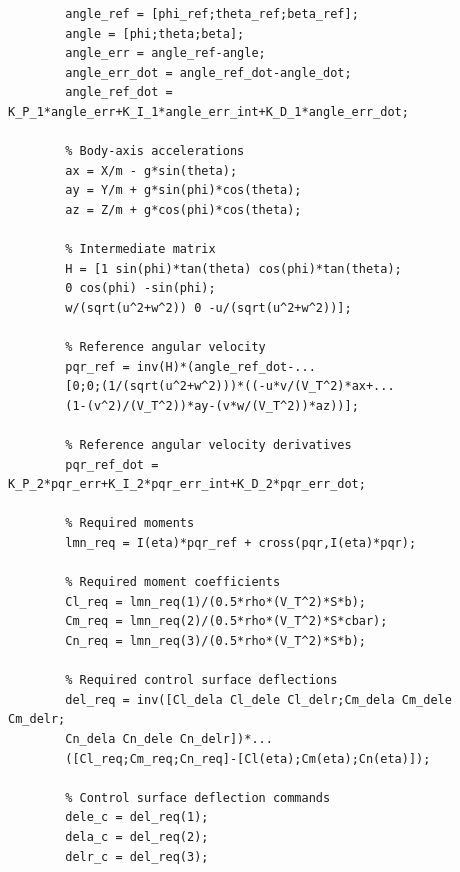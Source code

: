 \documentclass[a4paper, 12pt]{report}
\begin{document}
	\pagebreak
	
	\begin{lstlisting}[style=matlabFrameTB, gobble=4]
		% Reference angle derivatives
		angle_ref = [phi_ref;theta_ref;beta_ref];
		angle = [phi;theta;beta];
		angle_err = angle_ref-angle;
		angle_err_dot = angle_ref_dot-angle_dot;
		angle_ref_dot = K_P_1*angle_err+K_I_1*angle_err_int+K_D_1*angle_err_dot;
		
		% Body-axis accelerations
		ax = X/m - g*sin(theta);
		ay = Y/m + g*sin(phi)*cos(theta);
		az = Z/m + g*cos(phi)*cos(theta);
		
		% Intermediate matrix
		H = [1 sin(phi)*tan(theta) cos(phi)*tan(theta);
		0 cos(phi) -sin(phi);
		w/(sqrt(u^2+w^2)) 0 -u/(sqrt(u^2+w^2))];
		
		% Reference angular velocity       
		pqr_ref = inv(H)*(angle_ref_dot-...
		[0;0;(1/(sqrt(u^2+w^2)))*((-u*v/(V_T^2)*ax+...
		(1-(v^2)/(V_T^2))*ay-(v*w/(V_T^2))*az))];
		
		% Reference angular velocity derivatives
		pqr_ref_dot = K_P_2*pqr_err+K_I_2*pqr_err_int+K_D_2*pqr_err_dot;
		
		% Required moments
		lmn_req = I(eta)*pqr_ref + cross(pqr,I(eta)*pqr);
		
		% Required moment coefficients
		Cl_req = lmn_req(1)/(0.5*rho*(V_T^2)*S*b);
		Cm_req = lmn_req(2)/(0.5*rho*(V_T^2)*S*cbar);
		Cn_req = lmn_req(3)/(0.5*rho*(V_T^2)*S*b);
		
		% Required control surface deflections
		del_req = inv([Cl_dela Cl_dele Cl_delr;Cm_dela Cm_dele Cm_delr;
		Cn_dela Cn_dele Cn_delr])*...
		([Cl_req;Cm_req;Cn_req]-[Cl(eta);Cm(eta);Cn(eta)]);
		
		% Control surface deflection commands
		dele_c = del_req(1);
		dela_c = del_req(2);
		delr_c = del_req(3);
	\end{lstlisting}
\end{document}
